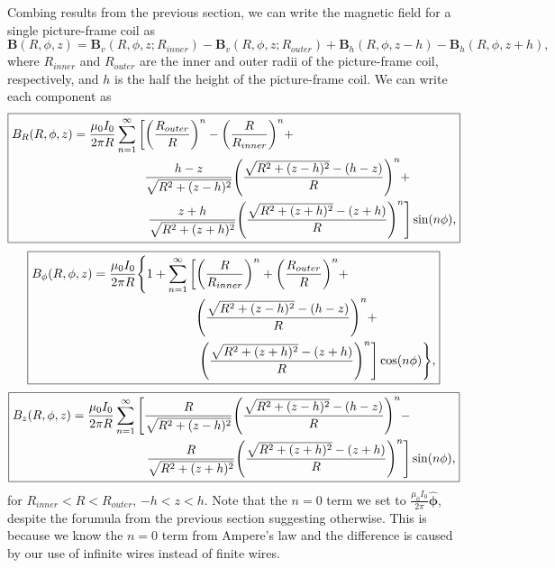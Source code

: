 \documentclass{article}
\let\vec\mathbf
\begin{document}
Combing results from the previous section, we can write the magnetic field
for a single picture-frame coil as
\[\vec{B}(R,\phi, z) = \vec{B}_{v}(R, \phi, z; R_{inner}) - \vec{B}_{v}(R, \phi, z; R_{outer}) + \vec{B}_{h}(R, \phi, z-h) - \vec{B}_{h}(R, \phi, z+h),\]
where $R_{inner}$ and $R_{outer}$ are the inner and outer radii of the picture-frame coil, respectively,
and $h$ is the half the height of the picture-frame coil. We can write each component as
\[\boxed{
\begin{aligned}
B_R(R,\phi,z) = \frac{\mu_0 I_0}{2 \pi R}\sum_{n=1}^{\infty}&\left[\qty(\frac{R_{outer}}{R})^n-\qty(\frac{R}{R_{inner}})^n+\right. \\
&\ \ \frac{h-z}{\sqrt{R^2+(z-h)^2}}\qty(\frac{\sqrt{R^2+(z-h)^2}-(h-z)}{R})^n+ \\
&\ \ \left.\frac{z+h}{\sqrt{R^2+(z+h)^2}}\qty(\frac{\sqrt{R^2+(z+h)^2}-(z+h)}{R})^n\right]\sin(n\phi),
\end{aligned}
}\]
\[\boxed{
\begin{aligned}
B_\phi(R,\phi,z) = \frac{\mu_0 I_0}{2 \pi R}\Bigg\{1+\sum_{n=1}^{\infty}&\left[\qty(\frac{R}{R_{inner}})^n+ \qty(\frac{R_{outer}}{R})^n+\right. \\
&\ \ \qty(\frac{\sqrt{R^2+(z-h)^2}-(h-z)}{R})^n+ \\
&\ \ \left.\qty(\frac{\sqrt{R^2+(z+h)^2}-(z+h)}{R})^n\right]\cos(n\phi)\Bigg\},
\end{aligned}
}\]
\[\boxed{
\begin{aligned}
B_z(R,\phi,z) = \frac{\mu_0 I_0}{2 \pi R}\sum_{n=1}^{\infty}&\left[\frac{R}{\sqrt{R^2+(z-h)^2}}\qty(\frac{\sqrt{R^2+(z-h)^2}-(h-z)}{R})^n-\right. \\
&\ \ \left.\frac{R}{\sqrt{R^2+(z+h)^2}}\qty(\frac{\sqrt{R^2+(z+h)^2}-(z+h)}{R})^n\right]\sin(n\phi),
\end{aligned}
}\]
for $R_{inner}<R<R_{outer}$, $-h<z<h$.
Note that the $n=0$ term we set to $\frac{\mu_0 I_0}{2 \pi}\vec{\hat{\phi}}$,
despite the forumula from the previous section suggesting otherwise.
This is because we know the $n=0$ term from Ampere's law and the difference
is caused by our use of infinite wires instead of finite wires.
\end{document}
